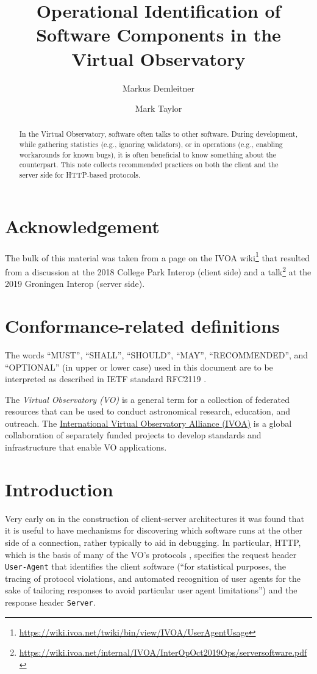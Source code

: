 \documentclass[11pt,a4paper]{ivoa}
\title{Operational Identification of Software Components in the Virtual
Observatory}
\author[https://wiki.ivoa.net/twiki/bin/view/IVOA/WebHome?topic=MarkusDemleitner]{Markus
Demleitner}
\author[https://wiki.ivoa.net/twiki/bin/view/IVOA/MarkusDemleitner?topic=MarkTaylor]{Mark
Taylor}
\newcommand{\headername}[1]{{\tt #1}}
\begin{document}
\begin{abstract}
In the Virtual Observatory, software often talks to other software.
During development, while gathering statistics (e.g., ignoring
validators), or in operations (e.g., enabling workarounds for known
bugs), it is often beneficial to know something about the
counterpart.  This note collects recommended practices on both the
client and the server side for HTTP-based protocols.
\end{abstract}

\section*{Acknowledgement}

The bulk of this material was taken from a page on the IVOA
wiki\footnote{\url{https://wiki.ivoa.net/twiki/bin/view/IVOA/UserAgentUsage}}
that resulted from a discussion at the 2018 College Park Interop (client
side) and a
talk\footnote{\url{https://wiki.ivoa.net/internal/IVOA/InterOpOct2019Ops/serversoftware.pdf}}
at the 2019 Groningen Interop (server side).


\section*{Conformance-related definitions}

The words ``MUST'', ``SHALL'', ``SHOULD'', ``MAY'', ``RECOMMENDED'', and
``OPTIONAL'' (in upper or lower case) used in this document are to be
interpreted as described in IETF standard RFC2119 \citep{std:RFC2119}.

The \emph{Virtual Observatory (VO)} is a
general term for a collection of federated resources that can be used
to conduct astronomical research, education, and outreach.
The \href{http://www.ivoa.net}{International
Virtual Observatory Alliance (IVOA)} is a global
collaboration of separately funded projects to develop standards and
infrastructure that enable VO applications.


\section{Introduction}

Very early on in the construction of client-server architectures it was
found that it is useful to have mechanisms for 
discovering which software runs
at the other side of a connection, rather typically to aid in debugging.
In particular, HTTP, which is the basis of many of the VO's protocols
\citep{std:HTTP}, specifies the request header \headername{User-Agent} that
identifies the client software (``for statistical purposes, the tracing
of protocol violations, and automated recognition of user agents for the
sake of tailoring responses to avoid particular user agent
limitations'') and the response header \headername{Server}.
\end{document}
